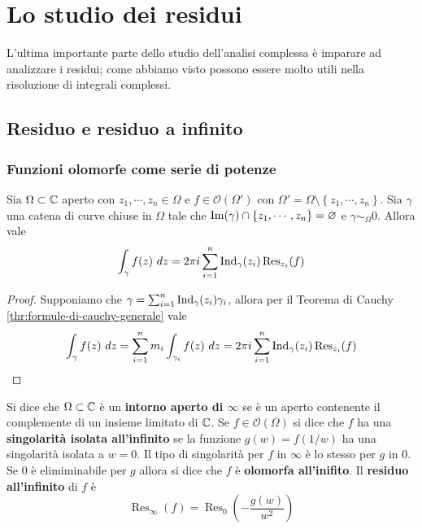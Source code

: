 \def \Res {\operatorname{Res}}

\chapter{Lo studio dei residui}
L'ultima importante parte dello studio dell'analisi complessa è imparare ad analizzare i residui; come abbiamo visto possono essere molto utili nella risoluzione di integrali complessi.
\newpage
\section{Residuo e residuo a infinito}
\subsection{\textcolor{AnComp}{\textbf{Funzioni olomorfe come serie di potenze}}}
\begin{theorem}
  Sia $\Omega \subset \mathbb{C}$ aperto con $z_1, \cdots, z_n \in \Omega$ e $f \in
  \mathcal{O}(\Omega')$ con $\Omega' = \Omega \setminus \left\{ z_1,\cdots, z_n
  \right\}$. Sia $\gamma$ una catena di curve chiuse in $\Omega$ tale che
  $\operatorname{Im}(\gamma) \cap \left\{ z_1, \cdots,z_n \right\} = \varnothing$ e $\gamma
  \sim_\Omega 0$. Allora vale 
  \begin{equation*}
    \int_\gamma f(z)\ dz = 2 \pi i \sum_{i=1}^{n} \Ind_\gamma(z_i)
    \Res_{z_i}(f)
  \end{equation*}
  \label{thr:teorema_dei_residui}
\end{theorem}
\begin{proof}
  Supponiamo che $\gamma = \sum_{i=1}^n \operatorname{Ind}_\gamma (z_i) \gamma_i$, allora
  per il Teorema di Cauchy \ref{thr:formule-di-cauchy-generale} vale 
  \begin{equation*}
    \int_\gamma f(z) \ dz = \sum_{i = 1}^{n} m_i \int_{\gamma_i} f(z) \ dz
    = 2 \pi i \sum_{i=1}^n \Ind_\gamma(z_i) \Res_{z_i}(f)
  \end{equation*}
\end{proof}

\begin{definition}
  Si dice che $\Omega \subset \mathbb{C}$ è un \textbf{intorno aperto di $\infty$} se
  è un aperto contenente il complemente di un insieme limitato di $\mathbb{C}$. Se $f
  \in \mathcal{O}(\Omega)$ si dice che $f$ ha una \textbf{singolarità isolata
  all'infinito} se la funzione $g(w) = f(1/w)$ ha una singolarità isolata a $w
  = 0$. Il tipo di singolarità per $f$ in $\infty$ è lo stesso per $g$ in $0$.
  Se $0$ è elimiminabile per $g$ allora si dice che $f$ è \textbf{olomorfa
  all'inifito}. Il \textbf{residuo all'infinito} di $f$ è 
  \begin{equation*}
    \Res_\infty(f) = \Res_0\left( -\frac{g(w)}{w^2} \right)
  \end{equation*}
  \label{def:varie_definizioni_all'inifinito}
\end{definition}


